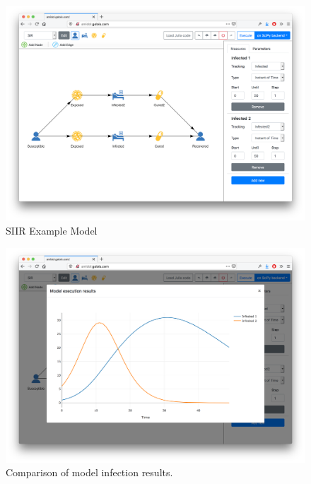 \documentclass[12pt]{galois-whitepaper}
\begin{document}
\begin{figure}
  \centering
  \includegraphics[width=\textwidth]{figs/comparision-ui-1.png}
  \caption{SIIR Example Model}
  \label{Fig:Comparison1}
\end{figure}

\begin{figure}
  \centering
  \includegraphics[width=\textwidth]{figs/comparision-ui-2.png}
  \caption{Comparison of model infection results.}
  \label{Fig:Comparison2}
\end{figure}
\end{document}
